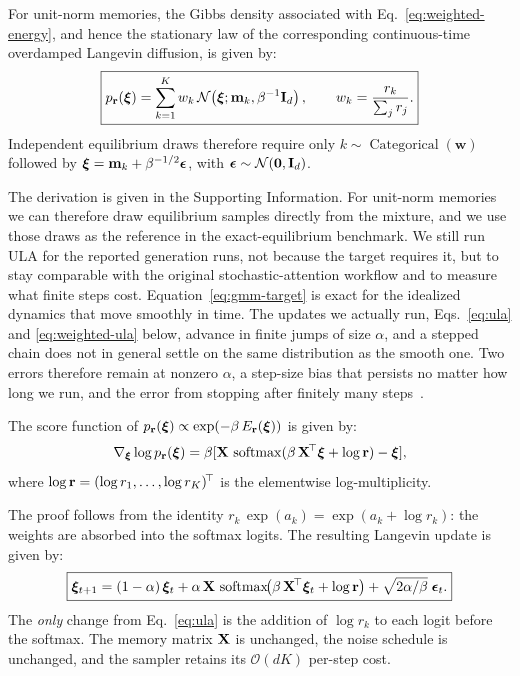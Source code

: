 \begin{samepage}
\begin{proposition}\label{prop:gmm-target}
For unit-norm memories, the Gibbs density associated with
Eq.~\eqref{eq:weighted-energy}, and hence the stationary law of the corresponding
continuous-time overdamped Langevin diffusion, is given by:
\begin{equation}\label{eq:gmm-target}
  \boxed{
  p_{\mathbf{r}}(\bm{\xi})
  = \sum_{k=1}^{K} w_k\,
    \mathcal{N}\!\left(\bm{\xi};\mathbf{m}_k,\beta^{-1}\mathbf{I}_d\right),
  \qquad
  w_k = \frac{r_k}{\sum_j r_j}.}
\end{equation}
Independent equilibrium draws therefore require only
$k\sim\operatorname{Categorical}(\mathbf{w})$ followed by
$\bm{\xi}=\mathbf{m}_k+\beta^{-1/2}\bm{\epsilon}$, with
$\bm{\epsilon}\sim\mathcal{N}(\mathbf{0},\mathbf{I}_d)$.
\end{proposition}
\end{samepage}

The derivation is given in the Supporting Information.
For unit-norm memories we can therefore draw equilibrium samples directly from the
mixture, and we use those draws as the reference in the exact-equilibrium benchmark.
We still run ULA for the reported generation runs, not because the target requires
it, but to stay comparable with the original stochastic-attention workflow and to
measure what finite steps cost.
Equation~\eqref{eq:gmm-target} is exact for the idealized dynamics that
move smoothly in time. The updates we actually run, Eqs.~\eqref{eq:ula} and
\eqref{eq:weighted-ula} below, advance in finite jumps of size $\alpha$, and a
stepped chain does not in general settle on the same distribution as the smooth one.
Two errors therefore remain at nonzero $\alpha$, a step-size bias that persists no
matter how long we run, and the error from stopping after finitely many
steps~\cite{durmusMoulinesULA2017}.

\begin{proposition}\label{prop:score}
The score function of $p_{\mathbf{r}}(\bm{\xi}) \propto \exp(-\beta\,E_{\mathbf{r}}(\bm{\xi}))$ is given by:
\[
\nabla_{\bm{\xi}}\log p_{\mathbf{r}}(\bm{\xi})
= \beta[\mathbf{X}\,\operatorname{softmax}(\beta\,\mathbf{X}^{\!\top}\bm{\xi} + \log\mathbf{r}) - \bm{\xi}],
\]
where $\log\mathbf{r} = (\log r_1, \ldots, \log r_K)^{\!\top}$ is the elementwise log-multiplicity.
\end{proposition}

The proof follows from the identity $r_k\,\exp(a_k) = \exp(a_k + \log r_k)$: the weights are
absorbed into the softmax logits. The resulting Langevin update is given by:
\begin{equation}\label{eq:weighted-ula}
  \boxed{
  \bm{\xi}_{t+1}
    = (1-\alpha)\,\bm{\xi}_{t}
    + \alpha\,\mathbf{X}\,\operatorname{softmax}\!\bigl(\beta\,\mathbf{X}^{\!\top}\bm{\xi}_{t} + \log\mathbf{r}\bigr)
    + \sqrt{2\alpha/\beta}\;\bm{\epsilon}_{t}.}
\end{equation}
The \emph{only} change from Eq.~\eqref{eq:ula} is the addition of $\log r_k$ to each logit
before the softmax. The memory matrix $\mathbf{X}$ is unchanged, the noise schedule is unchanged, and
the sampler retains its $\mathcal{O}(dK)$ per-step cost.

